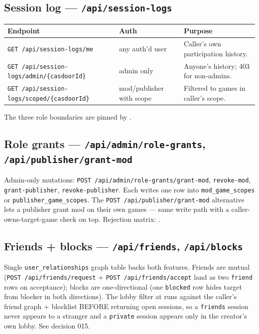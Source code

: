 \subsection{Session log --- \texttt{/api/session-logs}}

\begin{tabularx}{\linewidth}{l l X}
\toprule
\textbf{Endpoint} & \textbf{Auth} & \textbf{Purpose} \\
\midrule
\texttt{GET /api/session-logs/me} & any auth'd user & Caller's own participation history. \\
\texttt{GET /api/session-logs/admin/\{casdoorId\}} & admin only & Anyone's history; 403 for non-admins. \\
\texttt{GET /api/session-logs/scoped/\{casdoorId\}} & mod/publisher with scope & Filtered to games in caller's scope. \\
\bottomrule
\end{tabularx}

The three role boundaries are pinned by
.

\subsection{Role grants --- \texttt{/api/admin/role-grants}, \texttt{/api/publisher/grant-mod}}

Admin-only mutations: \texttt{POST /api/admin/role-grants/grant-mod},
\texttt{revoke-mod}, \texttt{grant-publisher}, \texttt{revoke-publisher}.
Each writes one row into \texttt{mod\_game\_scopes} or
\texttt{publisher\_game\_scopes}. The
\texttt{POST /api/publisher/grant-mod} alternative lets a publisher
grant mod on their own games --- same write path with a
caller-owns-target-game check on top. Rejection matrix:
.

\subsection{Friends + blocks --- \texttt{/api/friends}, \texttt{/api/blocks}}

Single \texttt{user\_relationships} graph table backs both
features. Friends are mutual (\texttt{POST /api/friends/request} +
\texttt{POST /api/friends/accept} land as two \texttt{friend} rows on
acceptance); blocks are one-directional (one \texttt{blocked} row hides
target from blocker in both directions). The lobby filter at
 runs against the
caller's friend graph + blocklist BEFORE returning open sessions, so a
\texttt{friends} session never appears to a stranger and a
\texttt{private} session appears only in the creator's own lobby. See
decision 015.

